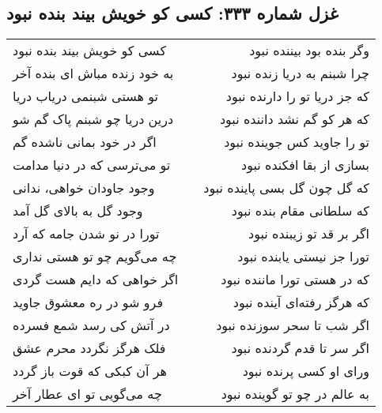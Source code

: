 \begin{center}
\section*{غزل شماره ۳۳۳: کسی کو خویش بیند بنده نبود}
\label{sec:333}
\begin{longtable}{l p{0.5cm} r}
کسی کو خویش بیند بنده نبود
&&
وگر بنده بود بیننده نبود
\\
به خود زنده مباش ای بنده آخر
&&
چرا شبنم به دریا زنده نبود
\\
تو هستی شبنمی دریاب دریا
&&
که جز دریا تو را دارنده نبود
\\
درین دریا چو شبنم پاک گم شو
&&
که هر کو گم نشد داننده نبود
\\
اگر در خود بمانی ناشده گم
&&
تو را جاوید کس جوینده نبود
\\
تو می‌ترسی که در دنیا مدامت
&&
بسازی از بقا افکنده نبود
\\
وجود جاودان خواهی، ندانی
&&
که گل چون گل بسی پاینده نبود
\\
وجود گل به بالای گل آمد
&&
که سلطانی مقام بنده نبود
\\
تورا در نو شدن جامه که آرد
&&
اگر بر قد تو زیبنده نبود
\\
چه می‌گویم چو تو هستی نداری
&&
تورا جز نیستی یابنده نبود
\\
اگر خواهی که دایم هست گردی
&&
که در هستی تورا ماننده نبود
\\
فرو شو در ره معشوق جاوید
&&
که هرگز رفته‌ای آینده نبود
\\
در آتش کی رسد شمع فسرده
&&
اگر شب تا سحر سوزنده نبود
\\
فلک هرگز نگردد محرم عشق
&&
اگر سر تا قدم گردنده نبود
\\
هر آن کبکی که قوت باز گردد
&&
ورای او کسی پرنده نبود
\\
چه می‌گویی تو ای عطار آخر
&&
به عالم در چو تو گوینده نبود
\\
\end{longtable}
\end{center}
